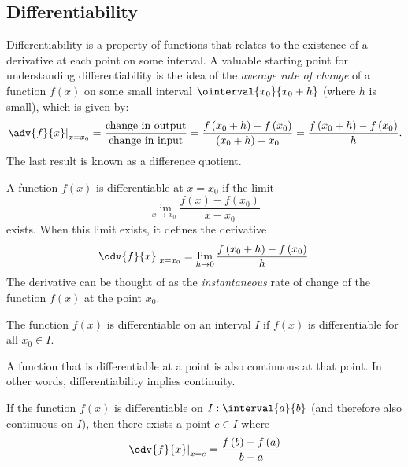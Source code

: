 \documentclass{article}
\begin{document}
\subsection{Differentiability}
Differentiability is a property of functions that relates to the
existence of a derivative at each point on some interval. A valuable
starting point for understanding differentiability is the idea of the
\textit{average rate of change} of a function \(f\left( x \right)\) on
some small interval \(\ointerval{x_0}{x_0+h}\) (where \(h\) is small),
which is given by:
\begin{equation*}
    \left. \adv{f}{x} \right\vert_{x = x_0} = \frac{\text{change in output}}{\text{change in input}} = \frac{f\left( x_0+h \right)-f\left( x_0 \right)}{\left( x_0 + h \right) - x_0} = \frac{f\left( x_0+h \right)-f\left( x_0 \right)}{h}.
\end{equation*}
The last result is known as a difference quotient.
\begin{definition}
    A function \(f\left( x \right)\) is differentiable at \(x=x_0\) if
    the limit
    \begin{equation*}
        \lim_{x\to x_0} \frac{f\left( x \right)-f\left( x_0 \right)}{x-x_0}
    \end{equation*}
    exists. When this limit exists, it defines the derivative
    \begin{equation*}
        \left.\odv{f}{x}\right|_{x=x_0} = \lim_{h\to 0} \frac{f\left( x_0+h \right)-f\left( x_0 \right)}{h}.
    \end{equation*}
    The derivative can be thought of as the \textit{instantaneous}
    rate of change of the function \(f\left( x \right)\) at the point
    \(x_0\).
\end{definition}
\begin{definition}
    The function \(f\left( x \right)\) is differentiable on an interval
    \(I\) if \(f\left( x \right)\) is differentiable for all \(x_0\in I\).
\end{definition}
\begin{theorem}
    A function that is differentiable at a point is also continuous at
    that point. In other words, differentiability implies continuity.
\end{theorem}
\begin{theorem}
    If the function \(f\left( x \right)\) is differentiable on
    \(I:\interval{a}{b}\) (and therefore also continuous on \(I\)), then
    there exists a point \(c\in I\) where
    \begin{equation*}
        \left.\odv{f}{x}\right|_{x=c}=\frac{f\left( b \right)-f\left( a \right)}{b-a}
    \end{equation*}
\end{theorem}
\end{document}
